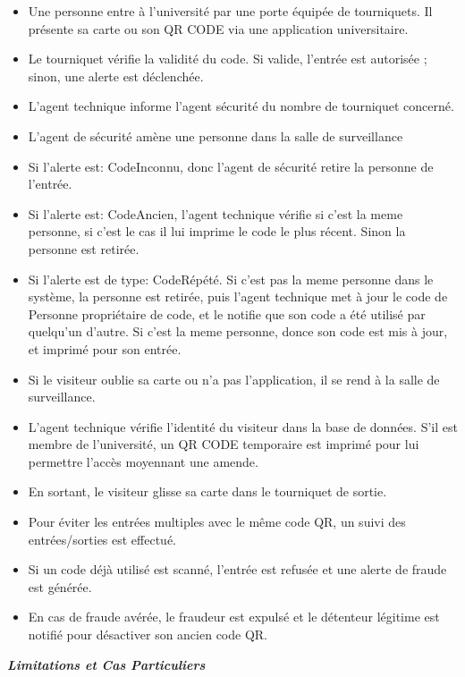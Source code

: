         \begin{itemize}
            \item Une personne entre à l'université par une porte équipée de tourniquets. Il présente sa carte ou son QR CODE via une application universitaire.
            \item Le tourniquet vérifie la validité du code. Si valide, l'entrée est autorisée ; sinon, une alerte est déclenchée.
            \item L'agent technique informe l'agent sécurité du nombre de tourniquet concerné.
            \item L'agent de sécurité amène une personne dans la salle de surveillance
            \item Si l'alerte est: CodeInconnu, donc l'agent de sécurité retire la personne de l'entrée.
            \item Si l'alerte est: CodeAncien, l'agent technique vérifie si c'est la meme personne, si c'est le cas il lui imprime le code le plus récent. Sinon la personne est retirée.
            \item Si l'alerte est de type: CodeRépété. Si c'est pas la meme personne dans le système, la personne est retirée, puis l'agent technique met à jour le code de Personne propriétaire de code, et le notifie que son code a été utilisé par quelqu'un d'autre. Si c'est la meme personne, donce son code est mis à jour, et imprimé pour son entrée.
            \item Si le visiteur oublie sa carte ou n'a pas l'application, il se rend à la salle de surveillance.
            \item L'agent technique vérifie l'identité du visiteur dans la base de données. S'il est membre de l'université, un QR CODE temporaire est imprimé pour lui permettre l'accès moyennant une amende.
            \item En sortant, le visiteur glisse sa carte dans le tourniquet de sortie.
            \item Pour éviter les entrées multiples avec le même code QR, un suivi des entrées/sorties est effectué.
            \item Si un code déjà utilisé est scanné, l'entrée est refusée et une alerte de fraude est générée.
            \item En cas de fraude avérée, le fraudeur est expulsé et le détenteur légitime est notifié pour désactiver son ancien code QR.
        \end{itemize}

        \textbf{\textit{Limitations et Cas Particuliers}}
        \vspace{8px}

